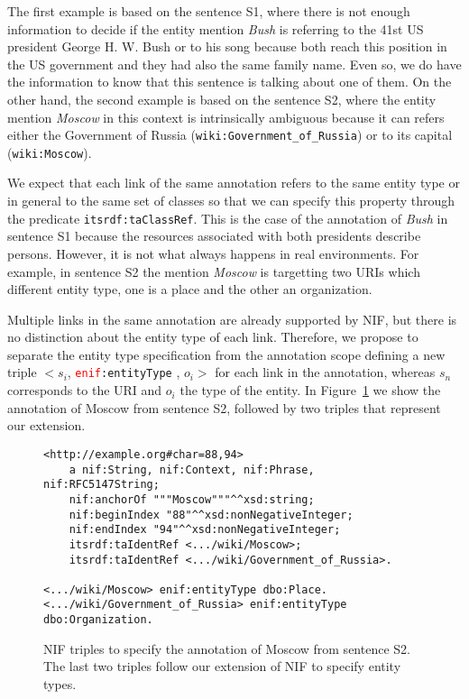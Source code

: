 \documentclass{llncs}
\begin{document}
The first example is based on the sentence S1, where there is not enough information to decide if the entity mention \textit{Bush} is referring to the 41st US president George H. W. Bush or to his song because both reach this position in the US government and they had also the same family name. Even so, we do have the information to know that this sentence is talking about one of them. On the other hand, the second example is based on the sentence S2, where the entity mention \textit{Moscow} in this context is intrinsically ambiguous because it can refers either the Government of Russia (\texttt{wiki:Government\_of\_Russia}) or to its capital (\texttt{wiki:Moscow}). 


We expect that each link of the same annotation refers to the same entity type or in general to the same set of classes so that we can specify this property through the predicate \texttt{itsrdf:taClassRef}. This is the case of the annotation of \textit{Bush} in sentence S1 because the resources associated with both presidents describe persons. However, it is not what always happens in real environments. For example, in sentence S2 the mention \textit{Moscow} is targetting two URIs which different entity type, one is a place and the other an organization.

Multiple links in the same annotation are already supported by NIF, but there is no distinction about the entity type of each link. Therefore, we propose to separate the entity type specification from the annotation scope defining a new triple $<s_i$, \texttt{\textcolor{red}{enif}:entityType} , $o_i>$ for each link in the annotation, whereas $s_n$ corresponds to the URI and $o_i$ the type of the entity. In Figure~\ref{fig:nif} we show the annotation of Moscow from sentence S2, followed by two triples that represent our extension. 

\begin{figure}
\caption{NIF triples to specify the annotation of Moscow from sentence S2. The last two triples follow our extension of NIF to specify entity types.}
\label{fig:nif}
\begin{Verbatim}[frame=single]
<http://example.org#char=88,94>
    a nif:String, nif:Context, nif:Phrase, nif:RFC5147String;
    nif:anchorOf """Moscow"""^^xsd:string;
    nif:beginIndex "88"^^xsd:nonNegativeInteger;
    nif:endIndex "94"^^xsd:nonNegativeInteger;
    itsrdf:taIdentRef <.../wiki/Moscow>;
    itsrdf:taIdentRef <.../wiki/Government_of_Russia>.  
    
<.../wiki/Moscow> enif:entityType dbo:Place.
<.../wiki/Government_of_Russia> enif:entityType dbo:Organization.
\end{Verbatim}
\end{figure}
\end{document}
